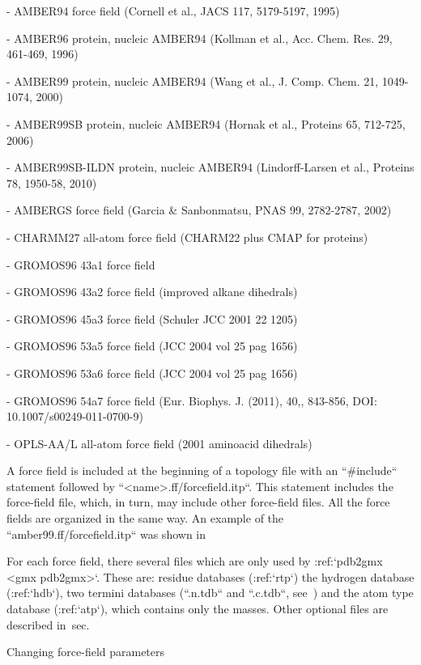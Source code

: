 -  AMBER94 force field (Cornell et al., JACS 117, 5179-5197, 1995)

-  AMBER96 protein, nucleic AMBER94 (Kollman et al., Acc. Chem. Res. 29,
   461-469, 1996)

-  AMBER99 protein, nucleic AMBER94 (Wang et al., J. Comp. Chem. 21,
   1049-1074, 2000)

-  AMBER99SB protein, nucleic AMBER94 (Hornak et al., Proteins 65,
   712-725, 2006)

-  AMBER99SB-ILDN protein, nucleic AMBER94 (Lindorff-Larsen et al.,
   Proteins 78, 1950-58, 2010)

-  AMBERGS force field (Garcia & Sanbonmatsu, PNAS 99, 2782-2787, 2002)

-  CHARMM27 all-atom force field (CHARM22 plus CMAP for proteins)

-  GROMOS96 43a1 force field

-  GROMOS96 43a2 force field (improved alkane dihedrals)

-  GROMOS96 45a3 force field (Schuler JCC 2001 22 1205)

-  GROMOS96 53a5 force field (JCC 2004 vol 25 pag 1656)

-  GROMOS96 53a6 force field (JCC 2004 vol 25 pag 1656)

-  GROMOS96 54a7 force field (Eur. Biophys. J. (2011), 40,, 843-856,
   DOI: 10.1007/s00249-011-0700-9)

-  OPLS-AA/L all-atom force field (2001 aminoacid dihedrals)

A force field is included at the beginning of a topology file with an
``#include`` statement followed by
``<name>.ff/forcefield.itp``. This statement includes the
force-field file, which, in turn, may include other force-field files.
All the force fields are organized in the same way. An example of the
``amber99.ff/forcefield.itp`` was shown in

For each force field, there several files which are only used by
:ref:`pdb2gmx <gmx pdb2gmx>`. These are: residue databases
(:ref:`rtp`) the hydrogen
database (:ref:`hdb`), two
termini databases (``.n.tdb`` and ``.c.tdb``,
see ) and the atom type database
(:ref:`atp`), which
contains only the masses. Other optional files are described
in sec.

Changing force-field parameters
~~~~~~~~~~~~~~~~~~~~~~~~~~~~~~~


